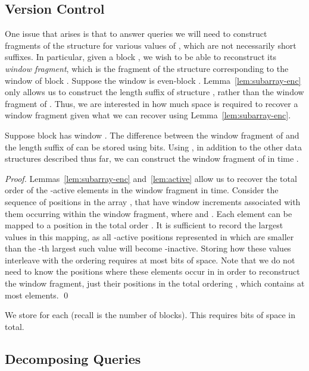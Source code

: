 \documentclass[runningheads]{llncs}
\begin{document}
\subsection{Version Control}

One issue that arises is that to answer queries we will need to
construct fragments of the structure  for various values of
, which are not necessarily short suffixes.  In particular, given a
block , we wish to be able to reconstruct its
\emph{window fragment}, which is the fragment of the structure
 corresponding to the window of block .
Suppose the window is even-block
. Lemma~\ref{lem:subarray-enc} only allows us to
construct the length  suffix of structure , rather
than the window fragment of .  Thus, we are interested
in how much space is required to recover a window fragment given what
we can recover using Lemma~\ref{lem:subarray-enc}.

\begin{lemma}
Suppose block  has window .  The
difference  between the window fragment of
 and the length  suffix of  can be
stored using  bits.  Using , in
addition to the other data structures described thus far, we can
construct the window fragment of  in time .
\end{lemma}

\begin{proof}
Lemmas~\ref{lem:subarray-enc} and~\ref{lem:active} allow us to recover
the total order  of the -active elements in the
window fragment in  time.  Consider the sequence of
positions in the array ,  that have window
increments associated with them occurring within the window fragment,
where  and .  Each element  can
be mapped to a position  in the total order .  It
is sufficient to record the  largest values in this mapping, as all
-active positions represented in  which are
smaller than the -th largest such value will become
-inactive.  Storing how these  values interleave with the
ordering  requires at most 
bits of space.  Note that we do not need to know the positions where
these elements occur in  in order to reconstruct the window
fragment, just their positions in the total ordering ,
which contains at most  elements. \qed
\end{proof}

We store  for each  (recall  is the
number of blocks).  This requires  bits of space in total.



\subsection{Decomposing Queries}
\end{document}
